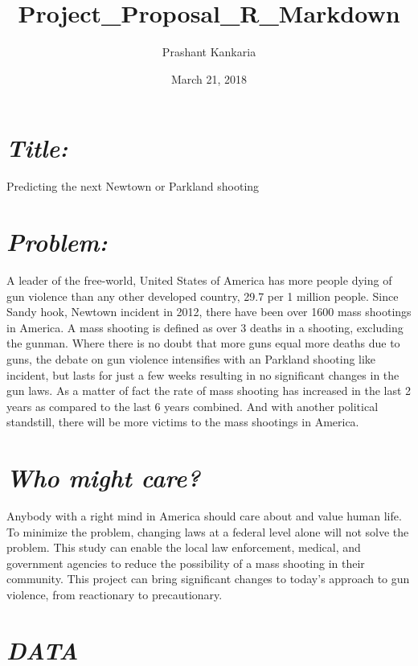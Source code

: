 \documentclass[]{article}
\title{Project\_Proposal\_R\_Markdown}
\author{Prashant Kankaria}
\date{March 21, 2018}
\begin{document}
\maketitle

\section{\texorpdfstring{\emph{Title:}}{Title:}}\label{title}

Predicting the next Newtown or Parkland shooting

\section{\texorpdfstring{\emph{Problem:}}{Problem:}}\label{problem}

A leader of the free-world, United States of America has more people
dying of gun violence than any other developed country, 29.7 per 1
million people. Since Sandy hook, Newtown incident in 2012, there have
been over 1600 mass shootings in America. A mass shooting is defined as
over 3 deaths in a shooting, excluding the gunman. Where there is no
doubt that more guns equal more deaths due to guns, the debate on gun
violence intensifies with an Parkland shooting like incident, but lasts
for just a few weeks resulting in no significant changes in the gun
laws. As a matter of fact the rate of mass shooting has increased in the
last 2 years as compared to the last 6 years combined. And with another
political standstill, there will be more victims to the mass shootings
in America.

\section{\texorpdfstring{\emph{Who might
care?}}{Who might care?}}\label{who-might-care}

Anybody with a right mind in America should care about and value human
life. To minimize the problem, changing laws at a federal level alone
will not solve the problem. This study can enable the local law
enforcement, medical, and government agencies to reduce the possibility
of a mass shooting in their community. This project can bring
significant changes to today's approach to gun violence, from
reactionary to precautionary.

\section{\texorpdfstring{\emph{DATA}}{DATA}}\label{data}
\end{document}
